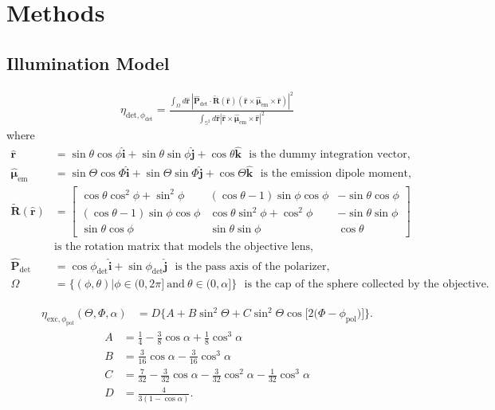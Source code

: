 \documentclass[10pt]{article}
\providecommand{\mb}[1]{\mathbf{#1}}
\providecommand{\mh}[1]{\mathbf{\hat{#1}}}
\providecommand{\bs}[1]{\boldsymbol{#1}}
\begin{document}
\section{Methods}
\subsection{Illumination Model}
\begin{align}
  \eta_{\text{det},\phi_{\text{det}}}  = \frac{\int_{\Omega}d\mh{r}\ \left|\mh{P}_{\text{det}}\cdot\tilde{\mb{R}}(\mh{r})(\mh{r}\times\hat{\bs{\mu}}_{\text{em}}\times\mh{r})\right|^2}{\int_{\mathbb{S}^2}d\mh{r}\left|\mh{r}\times\hat{\bs{\mu}}_{\text{em}}\times\mh{r}\right|^2}\label{eq:final}
\end{align}
where
\begin{align}
  \hat{\mb{r}} &= \sin\theta\cos\phi\hat{\mb{i}} + \sin\theta\sin\phi\hat{\mb{j}} + \cos\theta\hat{\mb{k}}\label{eq:r_coords}\ \ \ \text{is the dummy integration vector,}\\
  \hat{\bs{\mu}}_{\text{em}} &= \sin\Theta\cos\Phi\hat{\mb{i}} + \sin\Theta\sin\Phi\hat{\mb{j}} + \cos\Theta\hat{\mb{k}}\ \ \ \text{is the emission dipole moment,}\label{eq:mu_coords}\\
  \tilde{\mb{R}}(\mh{r}) &= \begin{bmatrix} \cos\theta\cos^2\phi + \sin^2\phi & (\cos\theta -1)\sin\phi\cos\phi & -\sin\theta\cos\phi\\ (\cos\theta - 1)\sin\phi\cos\phi & \cos\theta\sin^2\phi + \cos^2\phi & -\sin\theta\sin\phi \\ \sin\theta\cos\phi& \sin\theta\sin\phi & \cos\theta \end{bmatrix}\label{eq:matrix}\\&\text{is the rotation matrix that models the objective lens,}\\
  \hat{\mb{P}}_{\text{det}} &= \cos\phi_{\text{det}}\hat{\mb{i}} + \sin\phi_{\text{det}}\hat{\mb{j}}\ \ \ \text{is the pass axis of the polarizer,}\\
  \Omega &= \{(\phi, \theta)|\phi \in (0,2\pi]\ \text{and}\ \theta\in (0, \alpha]\}\ \ \ \text{is the cap of the sphere collected by the objective.}
\end{align}

\begin{align}
  \eta_{\text{exc},\phi_{\text{pol}}}(\Theta, \Phi, \alpha) &= D\{A + B\sin^{2}{\Theta} + C\sin^{2}{\Theta} \cos{[2 (\Phi - \phi_{\text{pol}}})]\}.
\end{align}
\begin{subequations}
\begin{align}
  A &= \frac{1}{4} - \frac{3}{8} \cos{\alpha } + \frac{1}{8} \cos^{3}{\alpha }\\
  B &= \frac{3}{16} \cos{\alpha } - \frac{3}{16} \cos^{3}{\alpha }\\
  C &= \frac{7}{32} - \frac{3}{32} \cos{\alpha } - \frac{3}{32} \cos^{2}{\alpha } - \frac{1}{32} \cos^{3}{\alpha}\\
  D &= \frac{4}{3(1 - \cos\alpha)}.
\end{align}%
\end{subequations}
\end{document}
